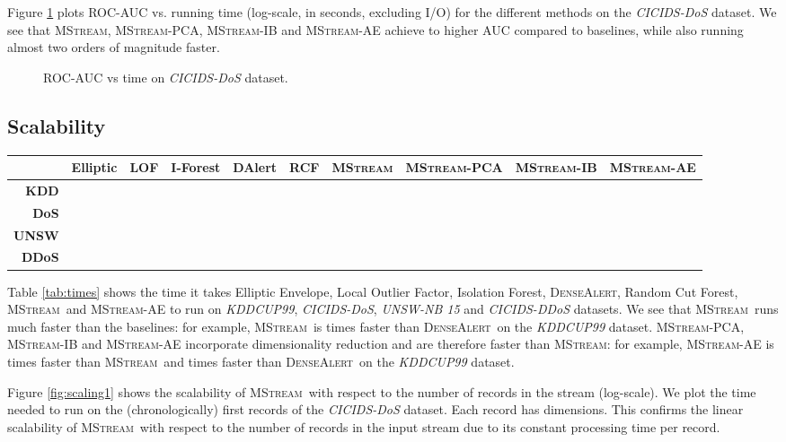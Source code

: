 \documentclass[sigconf]{acmart}
\newcommand{\method}{\textsc{MStream}}
\newcommand{\densealert}{\textsc{DenseAlert}}
\newcommand{\rcf}{Random Cut Forest}
\newcommand{\iso}{Isolation Forest}
\newcommand{\elliptic}{Elliptic Envelope}
\newcommand{\lof}{Local Outlier Factor}
\begin{document}
Figure \ref{fig:AUC} plots ROC-AUC vs. running time (log-scale, in seconds, excluding I/O) for the different methods on the \emph{CICIDS-DoS} dataset. We see that \method, \method-PCA, \method-IB and \method-AE achieve  to  higher AUC compared to baselines, while also running almost two orders of magnitude faster.


\begin{figure}[!htb]
        \caption{\label{fig:AUC} ROC-AUC vs time on \emph{CICIDS-DoS} dataset.}
\end{figure}


\subsection{Scalability}

\begin{table*}[!htb]
\centering
\caption{Running time of each method on different datasets in seconds.}
\label{tab:times}
\begin{tabular}{@{}rccccccccc@{}}
\toprule
& Elliptic
 & LOF
 & I-Forest
 &  DAlert
 & RCF
 & \textbf{\method}
 & \textbf{\method-PCA}
 & \textbf{\method-IB}
 & \textbf{\method-AE} \\ \midrule
 \textbf{KDD} &  &  &   &  &  &  &  &  &  \\
 \textbf{DoS} &  &  &  &   &  &  &  &  &  \\
 \textbf{UNSW} &  &  &  &  &  &  &  &  &  \\
\textbf{DDoS} &  &  &  &  &  &  &  &  &  \\
\bottomrule
\end{tabular}
\end{table*}

Table \ref{tab:times} shows the time it takes \elliptic, \lof, \iso, \densealert, \rcf, \method\ and \method-AE to run on \emph{KDDCUP99}, \emph{CICIDS-DoS}, \emph{UNSW-NB 15} and \emph{CICIDS-DDoS} datasets. We see that \method\ runs much faster than the baselines: for example, \method\ is  times faster than \densealert\ on the \emph{KDDCUP99} dataset. \method-PCA, \method-IB and \method-AE incorporate dimensionality reduction and are therefore faster than \method: for example, \method-AE is  times faster than \method\ and  times faster than \densealert\ on the \emph{KDDCUP99} dataset.


Figure \ref{fig:scaling1} shows the scalability of \method\ with respect to the number of records in the stream (log-scale). We plot the time needed to run on the (chronologically) first  records of the \emph{CICIDS-DoS} dataset. Each record has  dimensions. This confirms the linear scalability of \method\ with respect to the number of records in the input stream due to its constant processing time per record.
\end{document}
